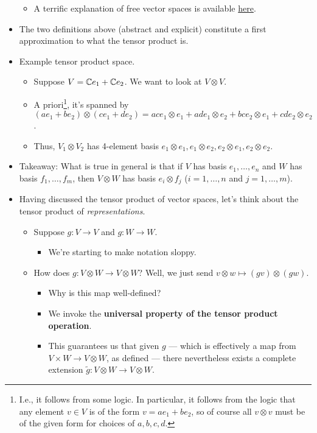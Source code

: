 \documentclass[../notes.tex]{subfiles}
\begin{document}
\begin{itemize}
\begin{itemize}
        \item A terrific explanation of free vector spaces is available \href{https://math.stackexchange.com/questions/18315/free-vector-space-and-vector-space}{here}.
    \end{itemize}
    \item The two definitions above (abstract and explicit) constitute a first approximation to what the tensor product is.
    \item Example tensor product space.
    \begin{itemize}
        \item Suppose $V=\mathbb{C} e_1+\mathbb{C} e_2$. We want to look at $V\otimes V$.
        \item A priori\footnote{I.e., it follows from some logic. In particular, it follows from the logic that any element $v\in V$ is of the form $v=ae_1+be_2$, so of course all $v\otimes v$ must be of the given form for choices of $a,b,c,d$.}, it's spanned by $(ae_1+be_2)\otimes(ce_1+de_2)=ace_1\otimes e_1+ade_1\otimes e_2+bce_2\otimes e_1+cde_2\otimes e_2$.
        \item Thus, $V_1\otimes V_2$ has 4-element basis $e_1\otimes e_1,e_1\otimes e_2,e_2\otimes e_1,e_2\otimes e_2$.
    \end{itemize}
    \item Takeaway: What is true in general is that if $V$ has basis $e_1,\dots,e_n$ and $W$ has basis $f_1,\dots,f_m$, then $V\otimes W$ has basis $e_i\otimes f_j$ ($i=1,\dots,n$ and $j=1,\dots,m$).
    \item Having discussed the tensor product of vector spaces, let's think about the tensor product of \emph{representations}.
    \begin{itemize}
        \item Suppose $g:V\to V$ and $g:W\to W$.
        \begin{itemize}
            \item We're starting to make notation sloppy.
        \end{itemize}
        \item How does $g:V\otimes W\to V\otimes W$? Well, we just send $v\otimes w\mapsto(gv)\otimes(gw)$.
        \begin{itemize}
            \item Why is this map well-defined?
            \item We invoke the \textbf{universal property of the tensor product operation}.
            \item This guarantees us that given $g$ --- which is effectively a map from $V\times W\to V\otimes W$, as defined --- there nevertheless exists a complete extension $\tilde{g}:V\otimes W\to V\otimes W$.

\end{itemize}
\end{itemize}
\end{itemize}
\end{document}
